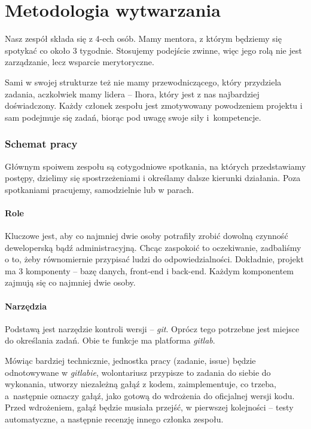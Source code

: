 \documentclass{article}
\begin{document}
\section{Metodologia wytwarzania}

Nasz zespół składa się z 4-ech osób. Mamy mentora, z którym będziemy się
spotykać co około 3 tygodnie. Stosujemy podejście zwinne, więc jego rolą nie jest
zarządzanie, lecz wsparcie merytoryczne.

Sami w swojej strukturze też nie mamy przewodniczącego, który przydziela zadania,
aczkolwiek mamy lidera -- Ihora, który jest z nas najbardziej doświadczony.
Każdy członek zespołu jest zmotywowany powodzeniem projektu i sam podejmuje się
zadań, biorąc pod uwagę swoje siły i~kompetencje.

\subsubsection*{Schemat pracy}
Głównym spoiwem zespołu są cotygodniowe spotkania, na których przedstawiamy
postępy, dzielimy się spostrzeżeniami i określamy dalsze kierunki działania.
Poza spotkaniami pracujemy, samodzielnie lub w parach.

\paragraph{Role}
Kluczowe jest, aby co najmniej dwie osoby potrafiły zrobić dowolną czynność
deweloperską bądź administracyjną. Chcąc zaspokoić to oczekiwanie,
zadbaliśmy o to, żeby równomiernie przypisać ludzi do odpowiedzialności.
Dokładnie, projekt ma 3 komponenty -- bazę danych, front-end i back-end.
Każdym komponentem zajmują się co najmniej dwie osoby.

\paragraph{Narzędzia}
Podstawą jest narzędzie kontroli wersji -- \textit{git}. Oprócz tego potrzebne jest
miejsce do określania zadań. Obie te funkcje ma platforma \textit{gitlab}.

Mówiąc bardziej technicznie, jednostka pracy (zadanie, issue) będzie odnotowywane
w \textit{gitlabie}, wolontariusz przypisze to zadania do siebie do wykonania,
utworzy niezależną gałąź z kodem, zaimplementuje, co trzeba, a~następnie oznaczy
gałąź, jako gotową do wdrożenia do oficjalnej wersji kodu. Przed wdrożeniem,
gałąź będzie musiała przejść, w pierwszej kolejności -- testy automatyczne,
a następnie recenzję innego członka zespołu.
\end{document}
